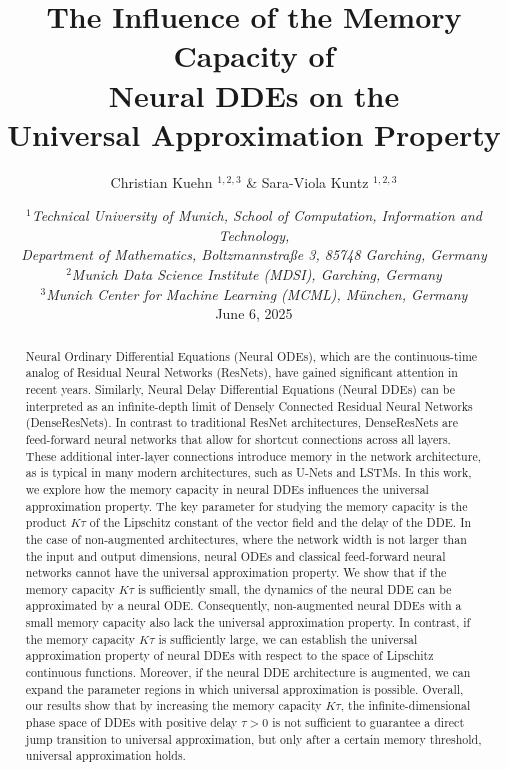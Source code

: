 \documentclass[10pt]{article}
\title{\textbf{The Influence of the Memory Capacity of \\ Neural DDEs on the \\ Universal Approximation Property}}
\author{Christian Kuehn \orcidlink{0000-0002-7063-6173}$^{1,2,3}$ 
	\& Sara-Viola Kuntz \orcidlink{0009-0000-4611-9742}$^{1,2,3}$
}
\date{
	\small{$^1$\textit{Technical University of Munich, School of Computation, Information and Technology, \\ Department of Mathematics, Boltzmannstraße 3, 85748 Garching, Germany} \\
		$^2$\textit{Munich Data Science Institute (MDSI), Garching, Germany } \\
		$^3$\textit{Munich Center for Machine Learning (MCML), München, Germany }}\\[5mm]
	\large{June 6, 2025}
}
\numberwithin{equation}{section}
\begin{document}
	\maketitle
	
	\vspace{-5mm}
	
	\begin{abstract}
		Neural Ordinary Differential Equations (Neural ODEs), which are the continuous-time analog of Residual Neural Networks (ResNets), have gained significant attention in recent years. Similarly, Neural Delay Differential Equations (Neural DDEs) can be interpreted as an infinite-depth limit of Densely Connected Residual Neural Networks (DenseResNets). In contrast to traditional ResNet architectures, DenseResNets are feed-forward neural networks that allow for shortcut connections across all layers. These additional inter-layer connections introduce memory in the network architecture, as is typical in many modern architectures, such as U-Nets and LSTMs. In this work, we explore how the memory capacity in neural DDEs influences the universal approximation property. The key parameter for studying the memory capacity is the product $K\tau$ of the Lipschitz constant of the vector field and the delay of the DDE. In the case of non-augmented architectures, where the network width is not larger than the input and output dimensions, neural ODEs and classical feed-forward neural networks cannot have the universal approximation property. We show that if the memory capacity $K\tau$ is sufficiently small, the dynamics of the neural DDE can be approximated by a neural ODE. Consequently, non-augmented neural DDEs with a small memory capacity also lack the universal approximation property. In contrast, if the memory capacity $K\tau$ is sufficiently large, we can establish the universal approximation property of neural DDEs with respect to the space of Lipschitz continuous functions. Moreover, if the neural DDE architecture is augmented, we can expand the parameter regions in which universal approximation is possible. Overall, our results show that by increasing the memory capacity $K\tau$, the infinite-dimensional phase space of DDEs with positive delay $\tau>0$ is not sufficient to guarantee a direct jump transition to universal approximation, but only after a certain memory threshold, universal approximation holds. 
	\end{abstract}
	
	\vspace{1mm}
	
	
\end{document}
